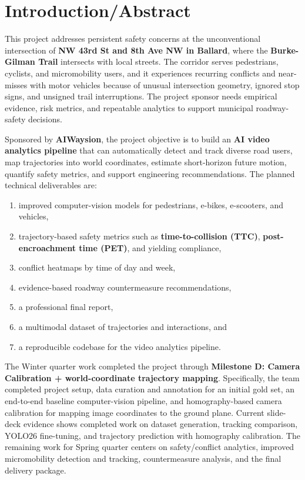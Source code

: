 \documentclass[12pt,letterpaper]{article}
\begin{document}
\section{Introduction/Abstract}

This project addresses persistent safety concerns at the unconventional intersection of \textbf{NW 43rd St and 8th Ave NW in Ballard}, where the \textbf{Burke-Gilman Trail} intersects with local streets. The corridor serves pedestrians, cyclists, and micromobility users, and it experiences recurring conflicts and near-misses with motor vehicles because of unusual intersection geometry, ignored stop signs, and unsigned trail interruptions. The project sponsor needs empirical evidence, risk metrics, and repeatable analytics to support municipal roadway-safety decisions.

Sponsored by \textbf{AIWaysion}, the project objective is to build an \textbf{AI video analytics pipeline} that can automatically detect and track diverse road users, map trajectories into world coordinates, estimate short-horizon future motion, quantify safety metrics, and support engineering recommendations. The planned technical deliverables are:
\begin{enumerate}
    \item improved computer-vision models for pedestrians, e-bikes, e-scooters, and vehicles,
    \item trajectory-based safety metrics such as \textbf{time-to-collision (TTC)}, \textbf{post-encroachment time (PET)}, and yielding compliance,
    \item conflict heatmaps by time of day and week,
    \item evidence-based roadway countermeasure recommendations,
    \item a professional final report,
    \item a multimodal dataset of trajectories and interactions, and
    \item a reproducible codebase for the video analytics pipeline.
\end{enumerate}

The Winter quarter work completed the project through \textbf{Milestone D: Camera Calibration + world-coordinate trajectory mapping}. Specifically, the team completed project setup, data curation and annotation for an initial gold set, an end-to-end baseline computer-vision pipeline, and homography-based camera calibration for mapping image coordinates to the ground plane. Current slide-deck evidence shows completed work on dataset generation, tracking comparison, YOLO26 fine-tuning, and trajectory prediction with homography calibration. The remaining work for Spring quarter centers on safety/conflict analytics, improved micromobility detection and tracking, countermeasure analysis, and the final delivery package.
\end{document}
